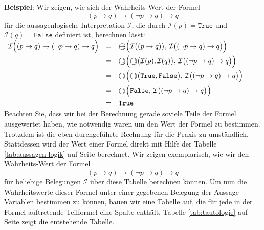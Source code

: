 \noindent
\textbf{Beispiel}: Wir zeigen, wie sich der Wahrheits-Wert der Formel
$$  (p \rightarrow q) \rightarrow (\neg p \rightarrow q) \rightarrow q $$
für die aussagenlogische Interpretation $\mathcal{I}$, die durch 
$\mathcal{I}(p) = \texttt{True}$ und $\mathcal{I}(q) = \texttt{False}$ definiert ist,
berechnen lässt: 
\\[0.2cm]
\hspace*{1.3cm}
$
  \begin{array}{lcl}
   \mathcal{I}\Bigl( (p \rightarrow q) \rightarrow (\neg p \rightarrow q) \rightarrow q  \Bigr) 
   & = &  \circright\Bigl( \mathcal{I}\bigl( (p \rightarrow q) \bigr),\, \mathcal{I}\bigl((\neg p \rightarrow q) \rightarrow q\bigr) \Bigr) \\[0.2cm]
   & = & \circright\Bigl( \circright\bigl( \mathcal{I}(p), \mathcal{I}(q) \bigr),\, \mathcal{I}\bigl((\neg p \rightarrow q) \rightarrow q\bigr) \Bigr) \\[0.2cm]
   & = & \circright\Bigl( \circright\bigl( \texttt{True}, \texttt{False} \bigr),\, \mathcal{I}\bigl((\neg p \rightarrow q) \rightarrow q\bigr) \Bigr) \\[0.2cm]
   & = & \circright\Bigl( \texttt{False}, \, \mathcal{I}\bigl((\neg p \rightarrow q) \rightarrow q\bigr) \Bigr) \\[0.2cm]
   & = & \texttt{True} \\
  \end{array}
$
\\[0.2cm]
Beachten Sie, dass wir bei der Berechnung gerade soviele Teile der Formel ausgewertet
haben, wie notwendig waren um den Wert der Formel zu bestimmen.  Trotzdem ist die
eben durchgeführte Rechnung für die Praxis zu umständlich.  Stattdessen wird der Wert
einer Formel direkt mit Hilfe der Tabelle \ref{tab:aussagen-logik} auf Seite
\pageref{tab:aussagen-logik} berechnet.  Wir zeigen exemplarisch, wie wir den
Wahrheits-Wert der Formel
$$  (p \rightarrow q) \rightarrow (\neg p \rightarrow q) \rightarrow q $$
für beliebige Belegungen $\mathcal{I}$ über diese Tabelle berechnen können.
 Um nun die Wahrheitswerte 
dieser Formel unter einer gegebenen Belegung der Aussage-Variablen bestimmen zu können,
 bauen wir eine  Tabelle auf, die für jede in der Formel
auftretende Teilformel eine Spalte enthält.  Tabelle \ref{tab:tautologie} auf Seite
\pageref{tab:tautologie} zeigt die entstehende Tabelle.
